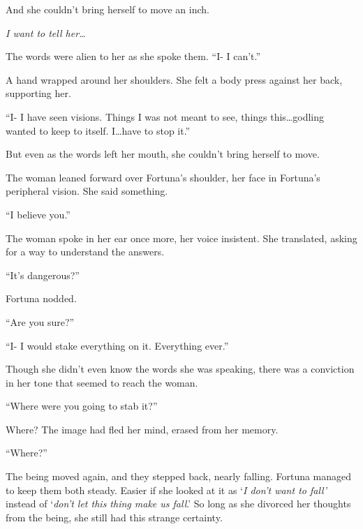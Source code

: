 And she couldn't bring herself to move an inch.



\emph{I want to tell her\ldots}



The words were alien to her as she spoke them.  ``I- I can't.''



A hand wrapped around her shoulders.  She felt a body press against her back, supporting her.



``I- I have seen visions.  Things I was not meant to see, things this\ldots godling wanted to keep to itself.  I\ldots have to stop it.''



But even as the words left her mouth, she couldn't bring herself to move.



The woman leaned forward over Fortuna's shoulder, her face in Fortuna's peripheral vision.  She said something.



``I believe you.''



The woman spoke in her ear once more, her voice insistent.  She translated, asking for a way to understand the answers.



``It's dangerous?''



Fortuna nodded.



``Are you sure?''



``I- I would stake everything on it.  Everything ever.''



Though she didn't even know the words she was speaking, there was a conviction in her tone that seemed to reach the woman.



``Where were you going to stab it?''



Where?  The image had fled her mind, erased from her memory.



``Where?''



The being moved again, and they stepped back, nearly falling.  Fortuna managed to keep them both steady.  Easier if she looked at it as `\emph{I don't want to fall'} instead of `\emph{don't let this thing make us fall}.'  So long as she divorced her thoughts from the being, she still had this strange certainty.



